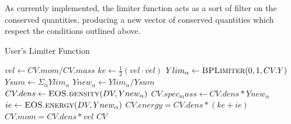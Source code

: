 \documentclass{article}
\begin{document}
As currently implemented, the limiter function acts as a sort of filter on the conserved quantities, producing a new vector of conserved quantities which respect the conditions outlined above.  
\begin{algorithm}
  \caption{User's Limiter Function}
  \begin{algorithmic}[1]
    \State $vel \gets CV.mom / CV.mass$
    \State $ke \gets \frac{1}{2}({vel}\cdot{vel})$
    \State $Ylim_\alpha \gets \Call{BPLimiter}{0, 1, CV.Y}$
    \State $Ysum \gets \Sigma_\alpha{Ylim_\alpha}$
    \State $Ynew_\alpha \gets Ylim_\alpha / Ysum$
    \State $CV.dens \gets \Call{EOS.density}{DV, Ynew_\alpha}$
    \State $CV.spec_mass \gets CV.dens * Ynew_\alpha$
    \State $ie \gets \Call{EOS.energy}{DV, Ynew_\alpha}$
    \State $CV.energy = CV.dens * (ke + ie)$
    \State $CV.mom = CV.dens * vel$
    \State \Return $CV$
    \EndProcedure  \end{algorithmic}
\end{algorithm}
\end{document}
